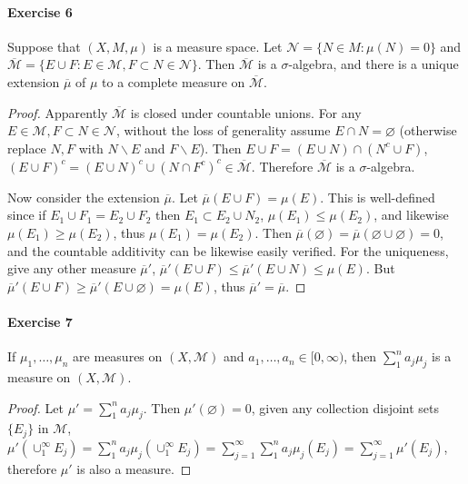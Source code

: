 \paragraph{Exercise 6}
Suppose that $(X,M,\mu)$ is a measure space. Let $\mathcal{N}=\{N\in M:\mu(N)=0\}$ and $\overline{\mathcal{M}}=\{E\cup F:E\in\mathcal{M}, F\subset N\in\mathcal{N}\}$. Then $\overline{\mathcal{M}}$ is a $\sigma$-algebra, and there is a unique extension $\overline{\mu}$ of $\mu$ to a complete measure on $\overline{\mathcal{M}}$.
\begin{proof}
    Apparently $\overline{\mathcal{M}}$ is closed under countable unions. For any $E\in\mathcal{M}, F\subset N\in\mathcal{N}$, without the loss of generality assume $E\cap N=\varnothing$ (otherwise replace $N,F$ with $N\backslash E$ and $F\backslash E$). Then $E\cup F=(E\cup N)\cap(N^c\cup F)$, $(E\cup F)^c=(E\cup N)^c\cup(N\cap F^c)^c\in\overline{\mathcal{M}}$. Therefore $\overline{\mathcal{M}}$ is a $\sigma$-algebra.
    \par Now consider the extension $\overline{\mu}$. Let $\overline{\mu}(E\cup F)=\mu(E)$. This is well-defined since if $E_1\cup F_1=E_2\cup F_2$ then $E_1\subset E_2\cup N_2$, $\mu(E_1)\le\mu(E_2)$, and likewise $\mu(E_1)\ge\mu(E_2)$, thus $\mu(E_1)=\mu(E_2)$. Then $\overline{\mu}(\varnothing)=\overline{\mu}(\varnothing\cup\varnothing)=0$, and the countable additivity can be likewise easily verified. For the uniqueness, give any other measure $\overline{\mu}'$, $\overline{\mu}'(E\cup F)\le\overline{\mu}'(E\cup N)\le\mu(E)$. But $\overline{\mu}'(E\cup F)\ge\overline{\mu}'(E\cup\varnothing)=\mu(E)$, thus $\overline{\mu}'=\overline{\mu}$.
\end{proof}
\paragraph{Exercise 7}
If $\mu_1,\dots,\mu_n$ are measures on $(X,\mathcal{M})$ and $a_1,\dots,a_n\in[0,\infty)$, then $\sum_1^n a_j\mu_j$ is a measure on $(X,\mathcal{M})$.
\begin{proof}
    Let $\mu'=\sum^n_1 a_j\mu_j$. Then $\mu'(\varnothing)=0$, given any collection disjoint sets $\{E_j\}$ in $\mathcal{M}$, $\mu'(\cup_1^\infty E_j)=\sum^n_1a_j\mu_j(\cup_1^\infty E_j)=\sum^{\infty}_{j=1}\sum^n_1a_j\mu_j(E_j)=\sum^\infty_{j=1}\mu'(E_j)$, therefore $\mu'$ is also a measure.
\end{proof}
